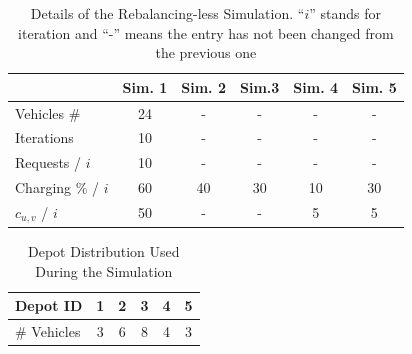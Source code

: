 \begin{table}[h]
		\centering
		\begin{tabular}{ |l| c|c|c|c|c|}
			\hline
			&Sim. 1 & Sim. 2& Sim.3&Sim. 4&Sim. 5 \\
			\hline
			Vehicles \#& 24&-&- &-&-\\
			Iterations & 10&-&-&-&-\\
			Requests / $i$ & 10&-&-&-&-\\
			Charging \% / $i$ & 60&40&30&10&30\\
			$c_{u,v}$  / $i$ & 50&-&-&5&5\\
		\end{tabular}
		\caption[Details of the Rebalancing-less Simulation]{Details of the Rebalancing-less Simulation. ``$i$'' stands for iteration and ``-'' means the entry has not been changed from the previous one}
		\label{tab:routingless_simu_details}   
\end{table} 
	\begin{table}[h]
	\centering
	\begin{tabular}{ | p{2cm} | c | c | c | c |c|}
		\hline
		Depot ID & 1 & 2 & 3 & 4 & 5\\
		\hline
		\# Vehicles & 3 & 6 & 8 & 4 & 3\\
	\end{tabular}
	\caption{Depot Distribution Used During the Simulation}
	\label{tab:routingless_depot_distribution}   
\end{table}


